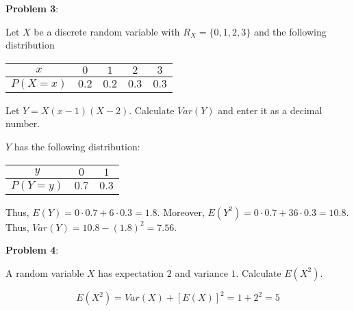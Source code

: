 \documentclass{article}
\begin{document}
\noindent\textbf{Problem 3}:

Let $X$ be a discrete random variable with $R_X=\{0,1,2,3\}$ and the following distribution

\begin{center}
    \begin{tabular}{|c|c|c|c|c|}
        \hline
        $x$&$0$&$1$&$2$&$3$\\
        \hline
        $P(X=x)$&$0.2$&$0.2$&$0.3$&$0.3$\\
        \hline
    \end{tabular}
\end{center}

Let $Y=X(x-1)(X-2)$. Calculate $Var(Y)$ and enter it as a decimal number.

{\color{blue}

$Y$ has the following distribution:

\begin{center}
    \begin{tabular}{|c|c|c|}
        \hline
        $y$&$0$&$1$\\
        \hline
        $P(Y=y)$&$0.7$&$0.3$\\
        \hline
    \end{tabular}
\end{center}

Thus, $E(Y)=0\cdot0.7+6\cdot0.3=1.8$. Moreover, $E(Y^2)=0\cdot0.7+36\cdot0.3=10.8$. Thus, $Var(Y)=10.8-(1.8)^2=7.56$.

}

\noindent\textbf{Problem 4}:

A random variable $X$ has expectation $2$ and variance $1$. Calculate $E(X^2)$.

{\color{blue}

$$E(X^2)=Var(X)+[E(X)]^2=1+2^2=5$$

}
\end{document}

